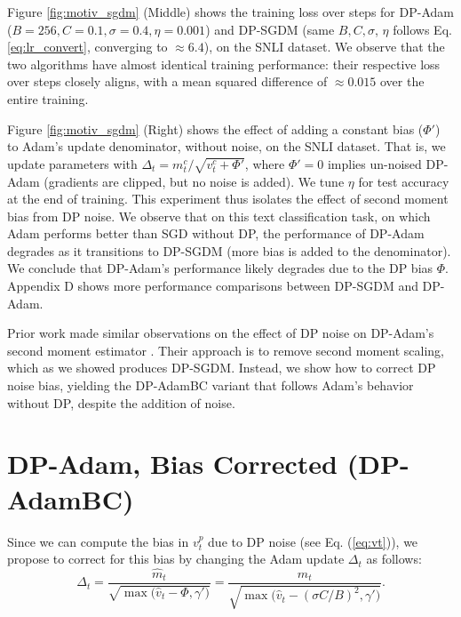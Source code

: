 \documentclass[letterpaper]{article} %
\begin{document}
Figure \ref{fig:motiv_sgdm} (Middle) shows the training loss over steps for DP-Adam ($B=256, C=0.1, \sigma=0.4, \eta=0.001$) and DP-SGDM (same $B, C, \sigma$, $\eta$ follows Eq. \ref{eq:lr_convert}, converging to $\approx 6.4$), on the SNLI dataset. We observe that the two algorithms have almost identical training performance:  their respective loss over steps closely aligns, with a mean squared difference of $\approx0.015$ over the entire training.

Figure \ref{fig:motiv_sgdm} (Right) shows the effect of adding a constant bias ($\Phi'$) to Adam's update denominator, without noise, on the SNLI dataset. That is, we update parameters with $\Delta_t = m_t^c/\sqrt{v_t^c + \Phi'}$, where $\Phi'=0$ implies un-noised DP-Adam (gradients are clipped, but no noise is added).
We tune $\eta$ for test accuracy at the end of training.
This experiment thus isolates the effect of second moment bias from DP noise.
We observe that on this text classification task, on which Adam performs better than SGD without DP, the performance of DP-Adam degrades as it transitions to DP-SGDM (more bias is added to the denominator). We conclude that DP-Adam's performance likely degrades due to the DP bias $\Phi$. Appendix D shows more performance comparisons between DP-SGDM and DP-Adam.

Prior work made similar observations on the effect of DP noise on DP-Adam's second moment estimator \cite{mohapatra2021role}. Their approach is to remove second moment scaling, which as we showed produces DP-SGDM. Instead, we show how to correct DP noise bias, yielding the DP-AdamBC variant that follows Adam's behavior without DP, despite the addition of noise.

\section{DP-Adam, Bias Corrected (DP-AdamBC)}
\label{sec:method}
Since we can compute the bias in $v_t^{p}$ due to DP noise (see Eq. (\ref{eq:vt})), we propose to correct for this bias by changing the Adam update $\Delta_t$ as follows:
\begin{equation}
\label{eq:adam_corr}
    \Delta_t = \frac{\hat{m}_t}{\sqrt{\max{\big(\hat{v}_t - \Phi}, \gamma' \big)}} = \frac{\hat{m}_t}{\sqrt{\max{\big(\hat{v}_t - (\sigma C / B)^{2}}, \gamma' \big)}}.
\end{equation}
\end{document}
